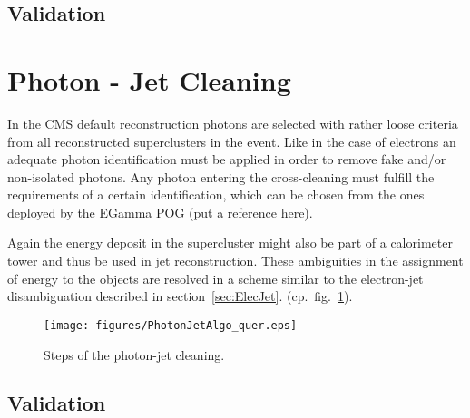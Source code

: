 \documentclass{cmspaper}
\begin{document}
\subsection{Validation}


\section{Photon - Jet Cleaning}
In the CMS default reconstruction photons are selected with rather loose criteria
from all reconstructed superclusters in the event. Like in the case of electrons
an adequate photon identification must be applied in order to remove fake and/or
non-isolated photons. Any photon entering the cross-cleaning must fulfill the
requirements of a certain identification, which can be chosen from the ones
deployed by the EGamma POG (put a reference here). 

Again the energy deposit in the supercluster might also be part of a
calorimeter tower and thus be used in jet reconstruction. These ambiguities in
the assignment of energy to the objects are resolved in a scheme similar to the
electron-jet disambiguation described in section~\ref{sec:ElecJet}. 
(cp.~fig.~\ref{fig:PJCleaning}).


\begin{figure}[hbt]
\begin{center}
\texttt{[image: figures/PhotonJetAlgo\_quer.eps]}
\caption{Steps of the photon-jet cleaning.}
\label{fig:PJCleaning}
\end{center}
\end{figure}

\subsection{Validation}

\end{document}
